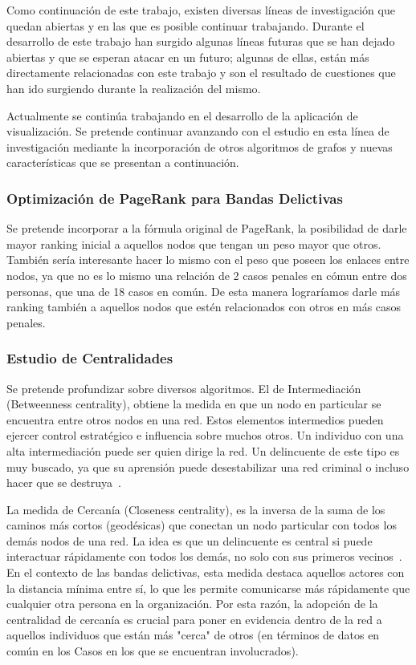 Como continuación de este trabajo, existen diversas líneas de investigación que quedan abiertas y en las que es posible continuar trabajando. Durante el desarrollo de este trabajo han surgido algunas líneas futuras que se han dejado abiertas y que se esperan atacar en un futuro; algunas de ellas, están más directamente relacionadas con este trabajo y son el resultado de cuestiones que han ido surgiendo durante la realización del mismo.

Actualmente se 	continúa trabajando en el desarrollo de la aplicación de visualización. Se pretende continuar avanzando con el estudio en esta línea de investigación mediante la incorporación de otros algoritmos de grafos y nuevas características que se presentan a continuación. 
\vspace{-10pt}
\subsubsection{Optimización de PageRank para Bandas Delictivas}
Se pretende incorporar a la fórmula original de PageRank, la posibilidad de darle mayor ranking inicial a aquellos nodos que tengan un peso mayor que otros. También sería interesante hacer lo mismo con el peso que poseen los enlaces entre nodos, ya que no es lo mismo una relación de 2 casos penales en cómun entre dos personas, que una de 18 casos en común. De esta manera lograríamos darle más ranking también a aquellos nodos que estén relacionados con otros en más casos penales. 
\subsubsection{Estudio de Centralidades}
Se pretende profundizar sobre diversos algoritmos. El de Intermediación (Betweenness centrality), obtiene la medida en que un nodo en particular se encuentra entre otros nodos en una red. Estos elementos intermedios pueden ejercer control estratégico e influencia sobre muchos otros. Un individuo con una alta intermediación puede ser quien dirige la red. Un delincuente de este tipo es muy buscado, ya que su aprensión puede desestabilizar una red criminal o incluso hacer que se destruya~\cite{carley2006destabilization}.

La medida  de Cercanía (Closeness centrality), es la inversa de la suma de los caminos más cortos (geodésicas) que conectan un nodo particular con todos los demás nodos de una red. La idea es que un delincuente es central si puede interactuar rápidamente con todos los demás, no solo con sus primeros vecinos~\cite{newman2005measure}. En el contexto de las bandas delictivas, esta medida destaca aquellos actores con la distancia mínima entre sí, lo que les permite comunicarse más rápidamente que cualquier otra persona en la organización. Por esta razón, la adopción de la centralidad de cercanía es crucial para poner en evidencia dentro de la red a aquellos individuos que están más "cerca" de otros (en términos de datos en común en los Casos en los que se encuentran involucrados).


